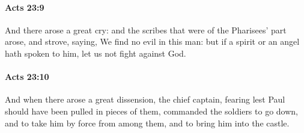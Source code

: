 		\paragraph{Acts 23:9} %
			\label{ACTS-23-9}

			And there arose a great cry: and the scribes that were of the Pharisees' part arose, and strove, saying, We find no evil in this man: but if a spirit or an angel hath spoken to him, let us not fight against God.

			\begin{framed}
			\scriptsize
				\begin{compactdesc}
					\item[SBLG] 
				\end{compactdesc}
			\end{framed}

		\paragraph{Acts 23:10} %
			\label{ACTS-23-10}

			And when there arose a great dissension, the chief captain, fearing lest Paul should have been pulled in pieces of them, commanded the soldiers to go down, and to take him by force from among them, and to bring him into the castle.

